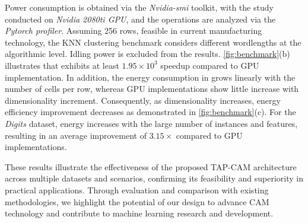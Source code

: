 Power consumption is obtained via the \textit{Nvidia-smi} toolkit, with the study conducted on \textit{Nvidia 2080ti GPU}, and the \design operations are analyzed via the \textit{Pytorch profiler}. Assuming 256 \design rows, feasible in current manufacturing technology, the KNN clustering benchmark considers different \design wordlengths at the algorithmic level. Idling power is excluded from the results. \autoref{fig:benchmark}(b) illustrates that \design exhibits at least $1.95\times 10^3$ speedup compared to GPU implementation. 
In addition, the energy consumption in \design grows linearly with the number of cells per row, whereas GPU implementations show little increase with dimensionality increment.
Consequently, as dimensionality increases, energy efficiency improvement decreases as demonstrated in \autoref{fig:benchmark}(c). 
For the \textit{Digits} dataset,
\design energy increases with the large number of instances and features,
resulting in an average improvement of $3.15\times$ compared to GPU implementations.

These results illustrate the effectiveness of the proposed TAP-CAM architecture across multiple datasets and scenarios, confirming its feasibility and superiority in practical applications. Through evaluation and comparison with existing methodologies, we highlight the potential of our design to advance CAM technology and contribute to machine learning research and development.